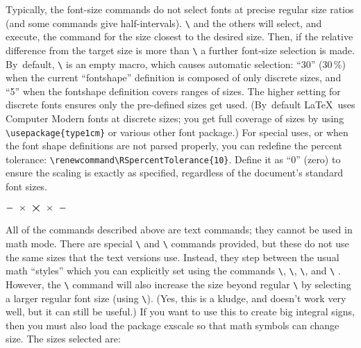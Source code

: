 \documentclass[12pt,pagesize=auto]{scrartcl}
\makeatletter
\newcommand*{\pkg}[1]{\textsf{#1}}
\newcommand*{\cs}[1]{\texttt{\textbackslash#1}}
\newcommand*{\cmd}[1]{\cs{\expandafter\@gobble\string#1}}
\makeatother
\begin{document}
Typically, the font-size commands do not select fonts at precise regular
size ratios (and some commands give half-intervals).  \cmd{\relsize} 
and the others will select, and execute, the command for the size 
closest to the desired size.  Then, if the relative difference 
from the target size is more than \cmd{\RSpercentTolerance} a further 
font-size selection is made.  By~default, \cmd{\RSpercentTolerance} 
is an empty macro, which causes automatic selection: ``30'' (30\,\%) 
when the current ``fontshape'' definition is composed of only discrete 
sizes, and ``5'' when the fontshape definition covers ranges of sizes.  
The higher setting for discrete fonts ensures only the pre-defined sizes 
get used.  (By~default \LaTeX\ uses Computer Modern fonts at discrete sizes; 
you get full coverage of sizes by using \verb+\usepackage{type1cm}+ or 
various other font package.)  For special uses, or when the font shape 
definitions are not parsed properly, you can redefine the percent tolerance: 
\verb+\renewcommand\RSpercentTolerance{10}+.  Define it as ``0'' (zero)
to ensure the scaling is exactly as specified, regardless of the
document's standard font sizes.

\smallskip

\noindent\centerline{$ - {~} \times {} \mathbin{\vcenter{\hbox{\Large $\times$}}} {} \times {~} - $}

\smallskip

\noindent
All of the commands described above are text commands; they cannot be used
in math mode.  There are special \cmd{\mathsmaller} and \cmd{\mathlarger} commands
provided, but these do not use the same sizes that the text versions use.
Instead, they step between the usual math ``styles'' which you can explicitly
set using the commands \cmd{\displaystyle}, \cmd{\textstyle}, \cmd{\scriptstyle}, and
\cmd{\scriptscriptstyle}%
\@.  However, the \cmd{\mathlarger} command will also increase the
size beyond regular \cmd{\displaystyle} by selecting a larger regular font size
(using \cmd{\larger})\@.  (Yes, this is a kludge, and doesn't work very well, but 
it can still be useful.)  If you want to use this to create big integral 
signs, then you must also load the package \pkg{exscale} so that math symbols
can change size.  The sizes selected are:
\end{document}
